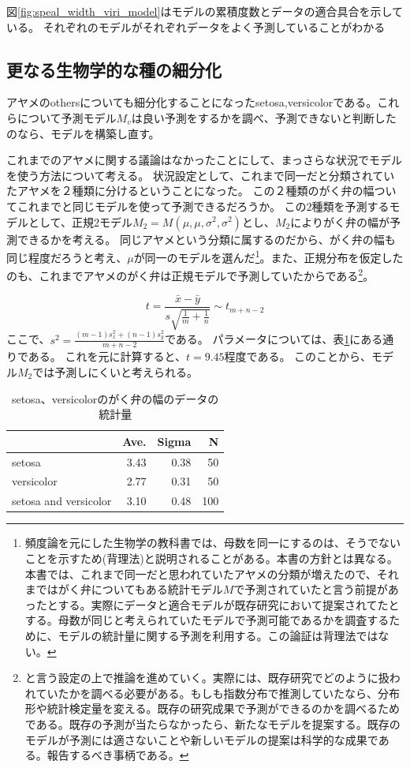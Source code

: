 図\ref{fig:speal_width_viri_model}はモデルの累積度数とデータの適合具合を示している。
それぞれのモデルがそれぞれデータをよく予測していることがわかる

\subsection{更なる生物学的な種の細分化}
アヤメのothersについても細分化することになったsetosa,versicolorである。これらについて予測モデル$M_v$は良い予測をするかを調べ、予測できないと判断したのなら、モデルを構築し直す。

これまでのアヤメに関する議論はなかったことにして、まっさらな状況でモデルを使う方法について考える。
状況設定として、これまで同一だと分類されていたアヤメを２種類に分けるということになった。
この２種類のがく弁の幅ついてこれまでと同じモデルを使って予測できるだろうか。
この$2$種類を予測するモデルとして、正規2モデル$M_2=M(\mu,\mu,\sigma^2,\sigma^2)$とし、$M_2$によりがく弁の幅が予測できるかを考える。
同じアヤメという分類に属するのだから、がく弁の幅も同じ程度だろうと考え、$\mu$が同一のモデルを選んだ\footnote{頻度論を元にした生物学の教科書では、母数を同一にするのは、そうでないことを示すため(背理法)と説明されることがある。本書の方針とは異なる。本書では、これまで同一だと思われていたアヤメの分類が増えたので、それまではがく弁についてもある統計モデル$M$で予測されていたと言う前提があったとする。実際にデータと適合モデルが既存研究において提案されてたとする。母数が同じと考えられていたモデルで予測可能であるかを調査するために、モデルの統計量に関する予測を利用する。この論証は背理法ではない。}。また、正規分布を仮定したのも、これまでアヤメのがく弁は正規モデルで予測していたからである\footnote{と言う設定の上で推論を進めていく。実際には、既存研究でどのように扱われていたかを調べる必要がある。もしも指数分布で推測していたなら、分布形や統計検定量を変える。既存の研究成果で予測ができるのかを調べるためである。既存の予測が当たらなかったら、新たなモデルを提案する。既存のモデルが予測には適さないことや新しいモデルの提案は科学的な成果である。報告するべき事柄である。}。

\begin{equation*}
    t = \frac{\bar{x}-\bar{y}}{s\sqrt{\frac{1}{m} + \frac{1}{n} }} \sim t_{m+n-2}
\end{equation*}
ここで、$s^2=\frac{(m-1)s_x^2+(n-1)s_y^2}{m+n-2}$である。
パラメータについては、表\ref{fig:seto_versi_speal_w_summary}にある通りである。
これを元に計算すると、$t=9.45$程度である。
このことから、モデル$M_2$では予測しにくいと考えられる。

\begin{table}
    \caption{setosa、versicolorのがく弁の幅のデータの統計量}
    \label{fig:seto_versi_speal_w_summary}
    \centering
    \begin{tabular}{lrrr}
        \hline
        {} &  Ave. &  Sigma &   N \\
        \hline \hline
        setosa     &  3.43 &   0.38 &  50 \\
        versicolor &  2.77 &   0.31 &  50 \\
        setosa and versicolor &  3.10 &   0.48 &  100 \\
        \hline
    \end{tabular}
\end{table}

